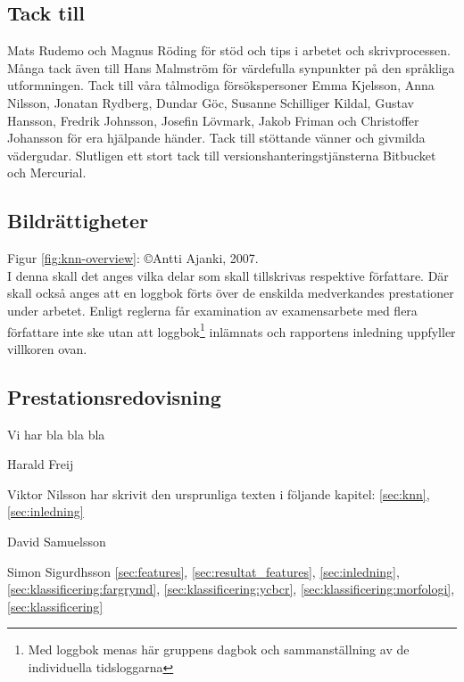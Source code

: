 \documentclass[../rapport_MVEX01-11-05]{subfiles}
\begin{document}
    \subsection*{Tack till}
    Mats Rudemo och Magnus Röding för stöd och tips i arbetet
    och skrivprocessen. Många tack även till Hans
    Malmström för värdefulla synpunkter på den språkliga utformningen.
    Tack till våra tålmodiga försökspersoner Emma Kjelsson, Anna Nilsson,
    Jonatan Rydberg, Dundar Göc, Susanne Schilliger Kildal, Gustav Hansson,
    Fredrik Johnsson, Josefin Lövmark, Jakob Friman och Christoffer Johansson
    för era hjälpande händer. Tack till stöttande vänner och givmilda
    vädergudar. Slutligen ett stort tack till versionshanteringstjänsterna Bitbucket och Mercurial.

    \subsection*{Bildrättigheter}
    Figur \ref{fig:knn-overview}: \copyright Antti Ajanki, 2007.\\

    
I denna skall det anges vilka delar som skall tillskrivas respektive
författare. Där skall också anges att en loggbok förts över de
enskilda medverkandes prestationer under arbetet.
Enligt reglerna får examination av examensarbete med flera författare
inte ske utan att loggbok\footnote{Med loggbok menas här gruppens
dagbok och sammanställning av de individuella tidsloggarna} inlämnats
och rapportens inledning uppfyller villkoren ovan.

\subsection*{Prestationsredovisning}
Vi har bla bla bla

Harald Freij

Viktor Nilsson har skrivit den ursprunliga texten i följande kapitel:
\ref{sec:knn}, \ref{sec:inledning}

David Samuelsson

Simon Sigurdhsson \ref{sec:features}, \ref{sec:resultat_features},
\ref{sec:inledning}, \ref{sec:klassificering:fargrymd},
\ref{sec:klassificering:ycbcr}, \ref{sec:klassificering:morfologi}, \ref{sec:klassificering}
\end{document}
